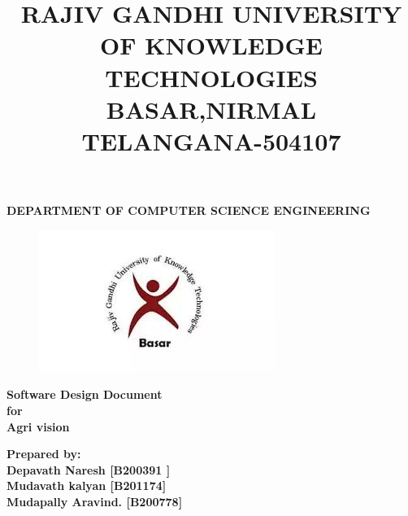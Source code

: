 \documentclass[a4paper,12pt]{article}
\title{\textbf{RAJIV GANDHI UNIVERSITY OF KNOWLEDGE TECHNOLOGIES\\BASAR,NIRMAL\\
		TELANGANA-504107}\\}
\date{}
\begin{document}
\maketitle
\begin{center}
	\textbf{DEPARTMENT OF COMPUTER SCIENCE ENGINEERING}
\end{center}
\begin{figure}[h]
	\centering
	\includegraphics[width= 8 cm]{logo1.jpeg}
\end{figure}

\begin{center}
	\textbf{\huge  Software Design Document}\\[.5cm] \textbf{for} \\[0.5cm]	\textbf{\huge Agri vision}\\[1cm]
\end{center}


\begin{center}
	\textbf{ Prepared by:}\\[0.5cm]
	\textbf{Depavath Naresh [B200391 ]}\\[0.5cm]
	\textbf{Mudavath kalyan  [B201174]}\\[0.5cm]
	\textbf{Mudapally Aravind. [B200778]}\\[0.5cm]
\end{center}
\newpage
\end{document}
